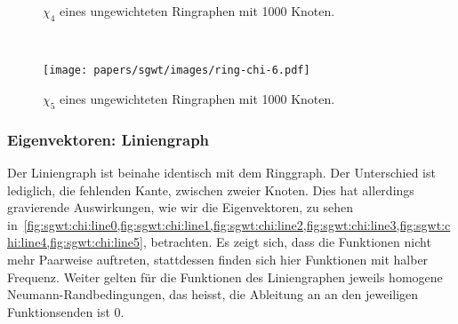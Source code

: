 \begin{figure}
\begin{minipage}[b]{0.49\textwidth}
        \vspace{-45pt}
        \caption{$\chi_4$ eines ungewichteten Ringraphen mit 1000 Knoten.}
        \label{fig:sgwt:chi:ring4}
    \end{minipage}
    ~
    \begin{minipage}[b]{0.49\textwidth}
        \texttt{[image: papers/sgwt/images/ring-chi-6.pdf]}
        \vspace{-45pt}
        \caption{$\chi_5$ eines ungewichteten Ringraphen mit 1000 Knoten.}
        \label{fig:sgwt:chi:ring5}
    \end{minipage}
\end{figure}

\subsubsection{Eigenvektoren: Liniengraph}
Der Liniengraph ist beinahe identisch mit dem Ringgraph. Der Unterschied ist 
lediglich, die fehlenden Kante, zwischen zweier Knoten. Dies hat allerdings 
gravierende Auswirkungen, wie wir die Eigenvektoren, zu sehen 
in~\cref{fig:sgwt:chi:line0,fig:sgwt:chi:line1,fig:sgwt:chi:line2,fig:sgwt:chi:line3,fig:sgwt:chi:line4,fig:sgwt:chi:line5},
betrachten. Es zeigt sich, dass die Funktionen nicht mehr Paarweise auftreten, 
stattdessen finden sich hier Funktionen mit halber Frequenz. Weiter gelten 
f\"ur die Funktionen des Liniengraphen jeweils homogene 
Neumann-Randbedingungen, das heisst, die Ableitung an an den 
jeweiligen Funktionsenden ist $0$.
